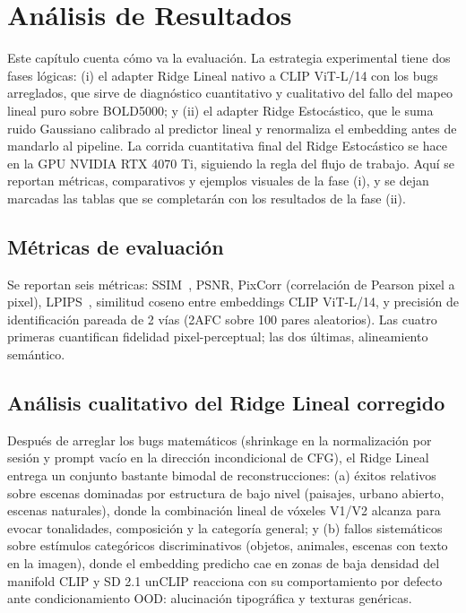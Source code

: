 \chapter{Análisis de Resultados}

Este capítulo cuenta cómo va la evaluación. La estrategia experimental tiene
dos fases lógicas: (i) el adapter Ridge Lineal nativo a CLIP ViT-L/14 con los
bugs arreglados, que sirve de diagnóstico cuantitativo y cualitativo del fallo
del mapeo lineal puro sobre BOLD5000; y (ii) el adapter Ridge Estocástico,
que le suma ruido Gaussiano calibrado al predictor lineal y renormaliza el
embedding antes de mandarlo al pipeline. La corrida cuantitativa final del
Ridge Estocástico se hace en la GPU NVIDIA RTX 4070 Ti, siguiendo la regla del
flujo de trabajo. Aquí se reportan métricas, comparativos y ejemplos visuales de
la fase (i), y se dejan marcadas las tablas que se completarán con los resultados
de la fase (ii).

\section{Métricas de evaluación}

Se reportan seis métricas: SSIM~\cite{wang2004ssim}, PSNR, PixCorr (correlación de 
Pearson pixel a pixel), LPIPS~\cite{zhang2018lpips}, similitud coseno entre embeddings 
CLIP ViT-L/14, y precisión de identificación pareada de 2 vías (2AFC sobre 100 pares 
aleatorios). Las cuatro primeras cuantifican fidelidad pixel-perceptual; las dos últimas, 
alineamiento semántico.

\section{Análisis cualitativo del Ridge Lineal corregido}

Después de arreglar los bugs matemáticos (shrinkage en la normalización
por sesión y prompt vacío en la dirección incondicional de CFG), el Ridge
Lineal entrega un conjunto bastante bimodal de reconstrucciones: (a) éxitos
relativos sobre escenas dominadas por estructura de bajo nivel (paisajes,
urbano abierto, escenas naturales), donde la combinación lineal de vóxeles
V1/V2 alcanza para evocar tonalidades, composición y la categoría general;
y (b) fallos sistemáticos sobre estímulos categóricos discriminativos (objetos,
animales, escenas con texto en la imagen), donde el embedding predicho cae
en zonas de baja densidad del manifold CLIP y SD 2.1 unCLIP reacciona
con su comportamiento por defecto ante condicionamiento OOD: alucinación
tipográfica y texturas genéricas.

